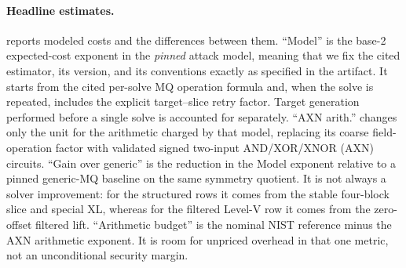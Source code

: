 \documentclass[11pt]{article}
\begin{document}
\paragraph{Headline estimates.}
 reports modeled costs and the differences between them.
``Model'' is the base-2 expected-cost exponent in the \emph{pinned} attack
model, meaning that we fix the cited estimator, its version, and its conventions
exactly as specified in the artifact.  It starts from the cited per-solve MQ
operation formula and, when the solve is repeated, includes
the explicit target--slice retry factor.  Target generation performed before a
single solve is accounted for separately.  ``AXN arith.'' changes only the unit
for the arithmetic charged by that model, replacing its coarse field-operation
factor with validated signed two-input AND/XOR/XNOR (AXN) circuits.  ``Gain over generic'' is the reduction in the Model exponent relative to a pinned generic-MQ
baseline on the same symmetry quotient.  It is not always a solver improvement: for the structured rows it
comes from the stable four-block slice and special XL, whereas for the filtered
Level-V row it comes from the zero-offset filtered lift.  ``Arithmetic budget''
is the nominal NIST reference minus the AXN arithmetic exponent.  It
is room for unpriced overhead in that one metric, not an unconditional
security margin.
\end{document}
